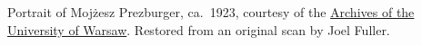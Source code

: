 Portrait of Moj\.zesz Prezburger, ca.~1923, courtesy of the
\href{http://www.archiwum.uw.edu.pl/}{Archives of the University
of Warsaw}.  Restored from an original scan by Joel Fuller.
